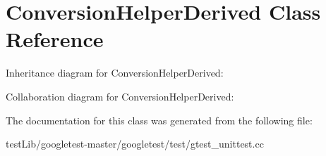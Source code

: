 \hypertarget{classConversionHelperDerived}{}\section{Conversion\+Helper\+Derived Class Reference}
\label{classConversionHelperDerived}


Inheritance diagram for Conversion\+Helper\+Derived\+:


Collaboration diagram for Conversion\+Helper\+Derived\+:


The documentation for this class was generated from the following file\+:\begin{DoxyCompactItemize}
\item 
test\+Lib/googletest-\/master/googletest/test/gtest\+\_\+unittest.\+cc\end{DoxyCompactItemize}
